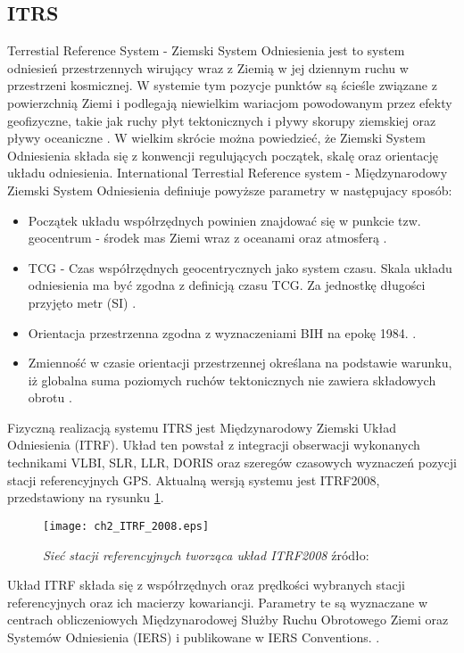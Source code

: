	\subsection{ITRS}
Terrestial Reference System - Ziemski System Odniesienia jest to system odniesień przestrzennych wirujący wraz z Ziemią w jej dziennym ruchu w 
przestrzeni kosmicznej. W systemie tym pozycje punktów są ścieśle związane z powierzchnią Ziemi i podlegają niewielkim wariacjom powodowanym przez efekty geofizyczne, 
takie jak ruchy płyt tektonicznych i pływy skorupy ziemskiej oraz pływy oceaniczne \cite[][strona 34]{IERS_2010}.
W wielkim skrócie można powiedzieć, że Ziemski System Odniesienia składa się z konwencji regulujących początek, skalę oraz orientację układu odniesienia.
International Terrestial Reference system - Międzynarodowy Ziemski System Odniesienia definiuje powyższe parametry w następujacy sposób:
\begin{itemize}
\item Początek układu współrzędnych powinien znajdować się w punkcie tzw. geocentrum - środek mas Ziemi wraz z oceanami oraz atmosferą \cite[]{IERS_2010}.
\item TCG - Czas współrzędnych geocentrycznych jako system czasu. Skala układu odniesienia ma być zgodna z definicją czasu TCG. Za jednostkę 
długości przyjęto metr (SI) \cite[]{IERS_2010}.
\item Orientacja przestrzenna zgodna z wyznaczeniami BIH na epokę 1984. \cite[]{IERS_2010}.
\item Zmienność w czasie orientacji przestrzennej określana na podstawie warunku, iż globalna suma poziomych ruchów tektonicznych nie zawiera składowych 
obrotu \cite[]{IGIK_ITRS}.
\end{itemize}
Fizyczną realizacją systemu ITRS jest Międzynarodowy Ziemski Układ Odniesienia (ITRF). Układ ten powstał z integracji obserwacji wykonanych technikami VLBI, 
SLR, LLR, DORIS oraz szeregów czasowych wyznaczeń pozycji stacji referencyjnych GPS. 
Aktualną wersją systemu jest ITRF2008, przedstawiony na rysunku \ref{fig:ch2_itrf_2008}. 
\begin{figure}[H]
\centering
\texttt{[image: ch2\_ITRF\_2008.eps]}
\caption{\textit{Sieć stacji referencyjnych tworząca układ ITRF2008} źródło: \cite[][strona 38]{IERS_2010}}
\label{fig:ch2_itrf_2008}
\end{figure}
Układ ITRF składa się z współrzędnych oraz prędkości wybranych stacji referencyjnych oraz ich macierzy kowariancji. Parametry te są wyznaczane 
w centrach obliczeniowych Międzynarodowej Służby Ruchu Obrotowego Ziemi oraz Systemów Odniesienia (IERS) i publikowane w IERS Conventions. \cite[][strona 167]{ROCZNIK_2014}.
